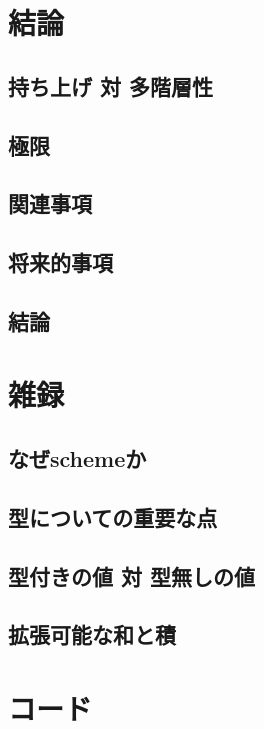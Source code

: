 \documentclass[11pt, oneside]{jsarticle}   	%
\begin{document}
\newpage
\section{ 結論 }
\subsection{ 持ち上げ 対 多階層性 }
\subsection{ 極限 }
\subsection{ 関連事項 }
\subsection{ 将来的事項 }
\subsection{ 結論 }


\newpage
\renewcommand{\thesection}{\Alph{section}}
\renewcommand{\thesubsection}{\thesection-\arabic{subsection}}
\setcounter{section}{0}

\section{ 雑録 }
\subsection{ なぜschemeか }
\subsection{ 型についての重要な点 }
\subsection{ 型付きの値 対 型無しの値 }
\subsection{ 拡張可能な和と積 }


\newpage
\section{コード}
\end{document}
